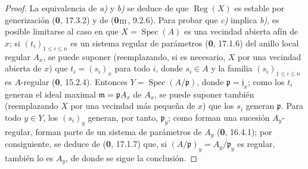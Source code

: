 \begin{proof}
La equivalencia de \emph{a)} y \emph{b)} se deduce de que $\operatorname{Reg}(X)$ es
estable por generización (\textbf 0, 17.3.2) y de (\textbf{0}$_{\rm III}$, 9.2.6). Para
probar que \emph{c)} implica \emph{b)}, es posible limitarse al caso en que
$X=\operatorname{Spec}(A)$ es una vecindad abierta afín de $x$; si
$(t_i)_{1\leq i\leq n}$ es un sistema regular de parámetros (\textbf 0, 17.1.6)
del anillo local regular $A_x$, se puede suponer (reemplazando, si es
necesario, $X$ por una vecindad abierta de $x$) que $t_i=(s_i)_x$ para todo
$i$, donde $s_i\in A$ y la familia $(s_i)_{1\leq i\leq n}$ es $A$-regular
(\textbf 0, 15.2.4). Entonces $Y=\operatorname{Spec}(A/\mathfrak p)$, donde
$\mathfrak p=\mathfrak j_x$; como los $t_i$ generan el ideal maximal
$\mathfrak m=\mathfrak pA_x$ de $A_x$, se puede suponer también (reemplazando
$X$ por una vecindad más pequeña de $x$) que los $s_i$ generan
$\mathfrak p$. Para todo $y\in Y$, los $(s_i)_y$ generan, por tanto,
$\mathfrak p_y$; como forman una sucesión $A_y$-regular, forman
parte de un sistema de parámetros de $A_y$ (\textbf 0, 16.4.1); por consiguiente,
se deduce de (\textbf 0, 17.1.7) que, si $(A/\mathfrak p)_y=A_y/\mathfrak p_y$
es regular, también lo es $A_y$, de donde se sigue la conclusión.
\end{proof}
